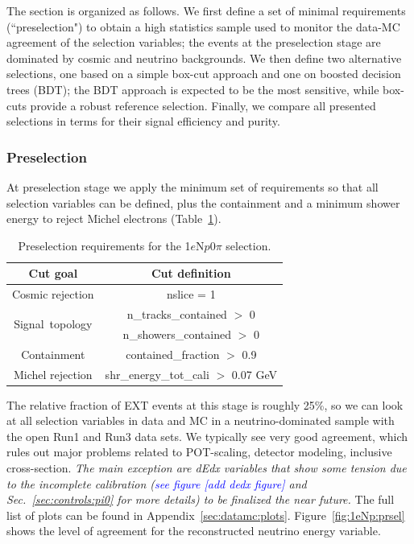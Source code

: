 \documentclass[a4paper]{article}
\newcommand{\npsel}{1$e$N$p$0$\pi$ }
\begin{document}
The section is organized as follows. We first define a set of minimal requirements (``preselection") to obtain a high statistics sample used to monitor the data-MC agreement of the selection variables;
the events at the preselection stage are dominated by cosmic and neutrino backgrounds. We then define two alternative selections, one based on a simple box-cut approach and one on boosted decision trees (BDT); the BDT approach is expected to be the most sensitive, while box-cuts provide a robust reference selection. Finally, we compare all presented selections in terms for their signal efficiency and purity.

\subsubsection{Preselection}

At preselection stage we apply the minimum set of requirements so that all selection variables can be defined, plus the containment and a minimum shower energy to reject Michel electrons (Table~\ref{tab:1eNp:presel}).

\begin{table}[h!]
\centering
\setlength{\tabcolsep}{10pt}
\renewcommand{\arraystretch}{1.25}
 \begin{tabular}{| c | c |} 
 \hline
 Cut goal & Cut definition \\
 \hline\hline
Cosmic rejection & nslice = 1 \\
 \hline
\multirow{2}{*}{Signal~topology} & n\_tracks\_contained $>$ 0 \\
 & n\_showers\_contained $>$ 0 \\
 \hline
Containment & contained\_fraction $>$ 0.9 \\
 \hline
Michel rejection & shr\_energy\_tot\_cali $>$ 0.07 GeV \\
 \hline
 \end{tabular}
 \caption{\label{tab:1eNp:presel} Preselection requirements for the \npsel selection.}
\end{table}

The relative fraction of EXT events at this stage is roughly 25\%, so we can look at all selection variables in data and MC in a neutrino-dominated sample with the open Run1 and Run3 data sets. We typically see very good agreement, which rules out major problems related to POT-scaling, detector modeling, inclusive cross-section. \emph{The main exception are dEdx variables that show some tension due to the incomplete calibration (\textcolor{blue}{see figure [add dedx figure]} and  Sec.~\ref{sec:controls:pi0} for more details) to be finalized the near future.} The full list of plots can be found in Appendix~\ref{sec:datamc:plots}. Figure~\ref{fig:1eNp:prsel} shows the level of agreement for the reconstructed neutrino energy variable. 
\end{document}
